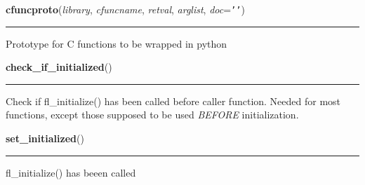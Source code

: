     \label{xformslib:library:cfuncproto}

    \vspace{0.5ex}

\hspace{.8\funcindent}\begin{boxedminipage}{\funcwidth}

    \raggedright \textbf{cfuncproto}(\textit{library}, \textit{cfuncname}, \textit{retval}, \textit{arglist}, \textit{doc}={\tt \texttt{'}\texttt{}\texttt{'}})

    \vspace{-1.5ex}

    \rule{\textwidth}{0.5\fboxrule}
\setlength{\parskip}{2ex}

Prototype for C functions to be wrapped in python
\setlength{\parskip}{1ex}
    \end{boxedminipage}

    \label{xformslib:library:check_if_initialized}

    \vspace{0.5ex}

\hspace{.8\funcindent}\begin{boxedminipage}{\funcwidth}

    \raggedright \textbf{check\_if\_initialized}()

    \vspace{-1.5ex}

    \rule{\textwidth}{0.5\fboxrule}
\setlength{\parskip}{2ex}

Check if fl\_initialize() has been called before caller function.
Needed for most functions, except those supposed to be used
\emph{BEFORE} initialization.
\setlength{\parskip}{1ex}
    \end{boxedminipage}

    \label{xformslib:library:set_initialized}

    \vspace{0.5ex}

\hspace{.8\funcindent}\begin{boxedminipage}{\funcwidth}

    \raggedright \textbf{set\_initialized}()

    \vspace{-1.5ex}

    \rule{\textwidth}{0.5\fboxrule}
\setlength{\parskip}{2ex}

fl\_initialize() has beeen called
\setlength{\parskip}{1ex}
    \end{boxedminipage}

